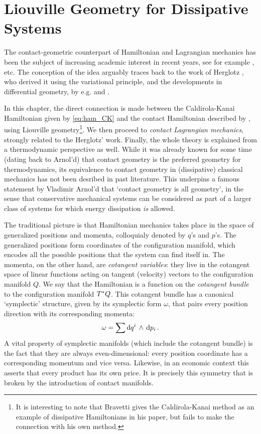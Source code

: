 \chapter{Liouville Geometry for Dissipative Systems}
\label{chap:contact_mechanics}
The contact-geometric counterpart of Hamiltonian and Lagrangian mechanics has been the subject of increasing academic interest in recent years, see for example \citet{VanderSchaft2021a,VanderSchaft2018,Maschke2018,Bravetti2017,DeLeon2020}, etc. The conception of the idea arguably traces back to the work of Herglotz \cite{Guenther1996}, who derived it using the variational principle, and the developments in differential geometry, by e.g. \citet{Arnold1989} and \citet{Libermann1987}.

In this chapter, the direct connection is made between the Caldirola-Kanai Hamiltonian given by \cref{eq:ham_CK} and the contact Hamiltonian described by \citet{Bravetti2017}, using Liouville geometry\footnote{It is interesting to note that Bravetti gives the Caldirola-Kanai method as an example of dissipative Hamiltonians in his paper, but fails to make the connection with his own method.}. We then proceed to \emph{contact Lagrangian mechanics}, strongly related to the Herglotz' work. Finally, the whole theory is explained from a thermodynamic perspective as well. While it was already known for some time (dating back to Arnol'd) that contact geometry is the preferred geometry for thermodynamics, its equivalence to contact geometry in (dissipative) classical mechanics has not been desribed in past literature. This underpins a famous statement by Vladimir Arnol'd that `contact geometry is all geometry', in the sense that conservative mechanical systems can be considered as part of a larger class of systems for which energy dissipation \emph{is} allowed. \cite{Geiges2008}

The traditional picture is that Hamiltonian mechanics takes place in the space of generalized positions and momenta, colloquialy denoted by $q$'s and $p$'s. The generalized positions form coordinates of the configuration manifold, which encodes all the possible positions that the system can find itself in. The momenta, on the other hand, are \emph{cotangent variables}: they live in the cotangent space of linear functions acting on tangent (velocity) vectors to the configuration manifold $Q$. We say that the Hamiltonian is a function on the \emph{cotangent bundle} to the configuration manifold $T^*Q$. This cotangent bundle has a canonical `symplectic' structure, given by its symplectic form $\omega$, that pairs every position direction with its corresponding momenta:
$$ \omega = \sum  \dd{q^i}\,\wedge\,\dd{p_i} . $$
A vital property of symplectic manifolds (which include the cotangent bundle) is the fact that they are always even-dimensional: every position coordinate has a corresponding momentum and vice versa. Likewise, in an economic context this asserts that every product has its own price. It is precisely this symmetry that is broken by the introduction of contact manifolds.


